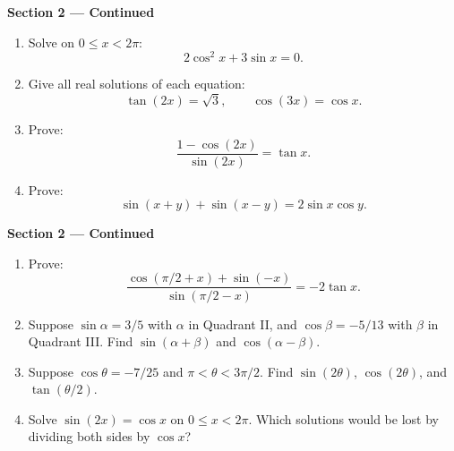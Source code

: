 \documentclass[11pt]{article}
\begin{document}
\newpage
\begin{center}{\large\textbf{Section 2 --- Continued}}\end{center}
\begin{enumerate}[leftmargin=*,itemsep=0pt,resume=chapterSeven]
  \item Solve on $0\le x<2\pi$:
  \[
    2\cos^2x+3\sin x=0.
  \]
  \par{}

  \item Give all real solutions of each equation:
  \[
    \tan(2x)=\sqrt3,\qquad \cos(3x)=\cos x.
  \]
  \par{}

  \item Prove:
  \[
    \frac{1-\cos(2x)}{\sin(2x)}=\tan x.
  \]
  \par{}

  \item Prove:
  \[
    \sin(x+y)+\sin(x-y)=2\sin x\cos y.
  \]
  \par{}
\end{enumerate}

\newpage
\begin{center}{\large\textbf{Section 2 --- Continued}}\end{center}
\begin{enumerate}[leftmargin=*,itemsep=0pt,resume=chapterSeven]
  \item Prove:
  \[
    \frac{\cos(\pi/2+x)+\sin(-x)}{\sin(\pi/2-x)}=-2\tan x.
  \]
  \par{}

  \item Suppose $\sin\alpha=3/5$ with $\alpha$ in Quadrant II, and
  $\cos\beta=-5/13$ with $\beta$ in Quadrant III.
  Find $\sin(\alpha+\beta)$ and $\cos(\alpha-\beta)$.
  \par{}

  \item Suppose $\cos\theta=-7/25$ and $\pi<\theta<3\pi/2$.
  Find $\sin(2\theta)$, $\cos(2\theta)$, and $\tan(\theta/2)$.
  \par{}

  \item Solve $\sin(2x)=\cos x$ on $0\le x<2\pi$.
  Which solutions would be lost by dividing both sides by $\cos x$?
  \par{}
\end{enumerate}
\end{document}
